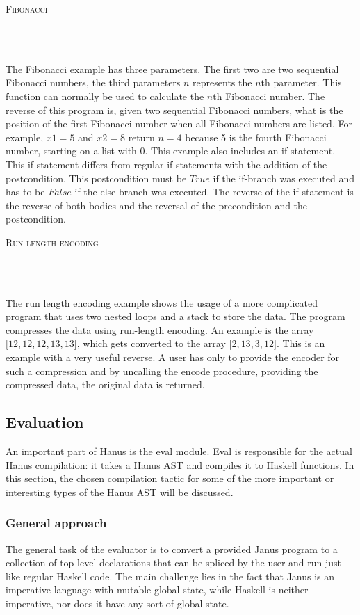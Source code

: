\documentclass[12pt,a4paper]{article}
\newcommand{\code}[2]{
	\begin{center}
		\vspace{.5cm}
		\textsc{\small #1}\\
		\vspace{.5cm}
	\end{center}
	\begin{minipage}{.9\textwidth}
		\inputminted[frame=lines,framesep=1cm,baselinestretch=.8,linenos,fontsize=\footnotesize]
			{haskell}{code/#2.hs}
	\end{minipage}
}
\begin{document}
\code{Fibonacci}{fibonacci} \\\\
The Fibonacci example has three parameters. The first two are two sequential Fibonacci numbers, the third parameters $n$ represents the $n$th parameter. This function can normally be used to calculate the $n$th Fibonacci number. The reverse of this program is, given two sequential Fibonacci numbers, what is the position of the first Fibonacci number when all Fibonacci numbers are listed. For example, $x1 = 5$ and $x2 = 8$ return $n=4$ because 5 is the fourth Fibonacci number, starting on a list with 0. This example also includes an if-statement. This if-statement differs from regular if-statements with the addition of the postcondition. This postcondition must be $True$ if the if-branch was executed and has to be $False$ if the else-branch was executed. The reverse of the if-statement is the reverse of both bodies and the reversal of the precondition and the postcondition.
\code{Run length encoding}{run-length-encoding}\\\\
The run length encoding example shows the usage of a more complicated program that uses two nested loops and a stack to store the data. The program compresses the data using run-length encoding. An example is the array $\lbrack 12, 12, 12, 13, 13 \rbrack$, which gets converted to the array $\lbrack 2, 13, 3, 12 \rbrack$. This is an example with a very useful reverse. A user has only to provide the encoder for such a compression and by uncalling the encode procedure, providing the compressed data, the original data is returned.

    \subsection{Evaluation}
        \label{sec-eval}
            An important part of Hanus is the eval module. Eval is responsible for the actual Hanus compilation: it takes a Hanus AST and compiles it to Haskell functions. In this section, the chosen compilation tactic for some of the more important or interesting types of the Hanus AST will be discussed.

\subsubsection{General approach}
The general task of the evaluator is to convert a provided Janus program to a collection of top level declarations that can be spliced by the user and run just like regular Haskell code. The main challenge lies in the fact that Janus is an imperative language with mutable global state, while Haskell is neither imperative, nor does it have any sort of global state. 
\end{document}

